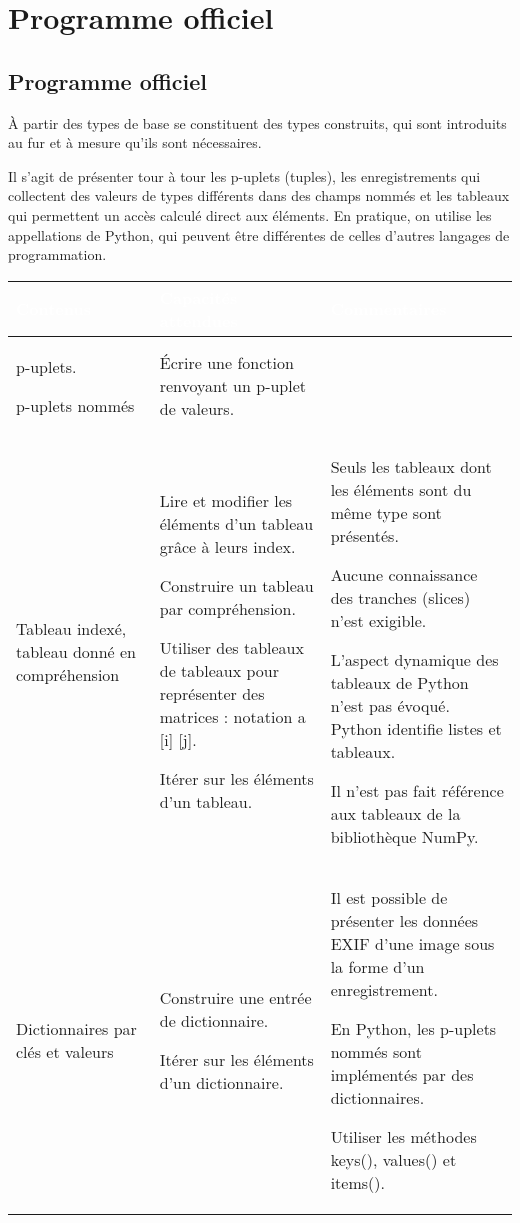 \chapter*{Programme officiel}

\section*{Programme officiel}

À partir des types de base se constituent des types construits, qui sont introduits au fur et à mesure qu'ils sont nécessaires.

Il s'agit de présenter tour à tour les p-uplets (tuples), les enregistrements qui collectent des valeurs de types différents dans des champs nommés et les tableaux qui permettent un accès calculé direct aux éléments. En pratique, on utilise les appellations de Python, qui peuvent être différentes de celles d'autres langages de programmation.

{\centering\begin{tabular}{|L{3cm}|L{5.5cm}|L{6cm}|}\hline
{}\bfseries\textcolor{white}{Contenus}&
\bfseries\textcolor{white}{Capacités attendues}&
\bfseries\textcolor{white}{Commentaires}\\ \hline
p-uplets.

p-uplets nommés
&
Écrire une fonction renvoyant un p-uplet de valeurs.
& \\ \hline
Tableau indexé, tableau donné en compréhension
&
Lire et modifier les éléments d'un tableau grâce à leurs index.

Construire un tableau par compréhension.

Utiliser des tableaux de tableaux pour représenter des matrices : notation a [i] [j].

Itérer sur les éléments d'un tableau.
&
Seuls les tableaux dont les éléments sont du même type sont présentés.

Aucune connaissance des tranches (slices) n'est exigible.

L’aspect dynamique des tableaux de Python n'est pas évoqué. Python identifie listes et tableaux.

Il n'est pas fait référence aux tableaux de la bibliothèque NumPy.\\ \hline
Dictionnaires par clés et valeurs
&
Construire une entrée de dictionnaire.

Itérer sur les éléments d'un dictionnaire.
&
Il est possible de présenter les données EXIF d'une image sous la forme d'un enregistrement.

En Python, les p-uplets nommés sont implémentés par des dictionnaires.

Utiliser les méthodes keys(), values() et items().\\ \hline
\end{tabular}\par}


